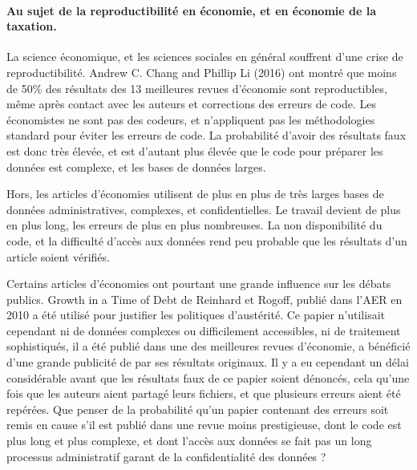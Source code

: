 \paragraph{Au sujet de la reproductibilité en économie, et en économie
de la
taxation.}

La science économique, et les sciences sociales en général souffrent
d'une crise de reproductibilité. Andrew C. Chang and Phillip Li (2016)
ont montré que moins de 50\% des résultats des 13 meilleures revues
d'économie sont reproductibles, même après contact avec les auteurs et
corrections des erreurs de code. Les économistes ne sont pas des
codeurs, et n'appliquent pas les méthodologies standard pour éviter les
erreurs de code. La probabilité d'avoir des résultats faux est donc très
élevée, et est d'autant plus élevée que le code pour préparer les
données est complexe, et les bases de données larges.

Hors, les articles d'économies utilisent de plus en plus de très larges
bases de données administratives, complexes, et confidentielles. Le
travail devient de plus en plus long, les erreurs de plus en plus
nombreuses. La non disponibilité du code, et la difficulté d'accès aux
données rend peu probable que les résultats d'un article soient
vérifiés.

Certains articles d'économies ont pourtant une grande influence sur les
débats publics. Growth in a Time of Debt de Reinhard et Rogoff, publié
dans l'AER en 2010 a été utilisé pour justifier les politiques
d'austérité. Ce papier n'utilisait cependant ni de données complexes ou
difficilement accessibles, ni de traitement sophistiqués, il a été
publié dans une des meilleures revues d'économie, a bénéficié d'une
grande publicité de par ses résultats originaux. Il y a eu cependant un
délai considérable avant que les résultats faux de ce papier soient
dénoncés, cela qu'une fois que les auteurs aient partagé leurs fichiers,
et que plusieurs erreurs aient été repérées. Que penser de la
probabilité qu'un papier contenant des erreurs soit remis en cause s'il
est publié dans une revue moins prestigieuse, dont le code est plus long
et plus complexe, et dont l'accès aux données se fait pas un long
processus administratif garant de la confidentialité des données ?

